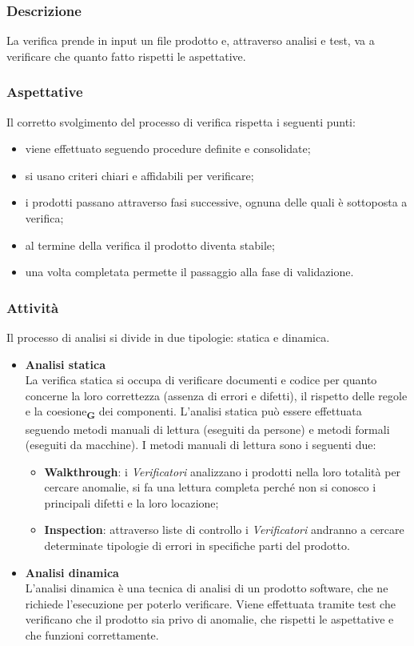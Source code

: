 \subsubsection{Descrizione}
La verifica prende in input un file prodotto e, attraverso analisi e test, va a verificare che quanto fatto rispetti le aspettative.
\subsubsection{Aspettative}
Il corretto svolgimento del processo di verifica rispetta i seguenti punti:
\begin{itemize}
    \item viene effettuato seguendo procedure definite e consolidate;
    \item si usano criteri chiari e affidabili per verificare;
    \item i prodotti passano attraverso fasi successive, ognuna delle quali è sottoposta a verifica;
    \item al termine della verifica il prodotto diventa stabile;
    \item una volta completata permette il passaggio alla fase di validazione.
\end{itemize}
\subsubsection{Attività}
Il processo di analisi si divide in due tipologie: statica e dinamica.
\begin{itemize}
    \item \textbf{Analisi statica}\\
          La verifica statica si occupa di verificare documenti e codice per quanto concerne la loro correttezza (assenza di errori e difetti), il rispetto delle regole e la coesione\textsubscript{\textbf{G}} dei componenti. L'analisi statica può essere effettuata seguendo metodi manuali di lettura (eseguiti da persone) e metodi formali (eseguiti da macchine). I metodi manuali di lettura sono i seguenti due:
          \begin{itemize}
              \item \textbf{Walkthrough}: i \textit{Verificatori} analizzano i prodotti nella loro totalità per cercare anomalie, si fa una lettura completa perché non si conosco i principali difetti e la loro locazione;
              \item \textbf{Inspection}: attraverso liste di controllo i \textit{Verificatori} andranno a cercare determinate tipologie di errori in specifiche parti del prodotto.
          \end{itemize}
    \item \textbf{Analisi dinamica}\\
          L'analisi dinamica è una tecnica di analisi di un prodotto software, che ne richiede l'esecuzione per poterlo verificare. Viene effettuata tramite test che verificano che il prodotto sia privo di anomalie, che rispetti le aspettative e che funzioni correttamente.
\end{itemize}

